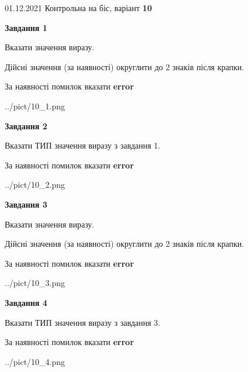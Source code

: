 \documentclass[11pt, ukrainian]{article}
\begin{document}
{01.12.2021 Контрольна на біс, варіант  \No \textbf { 10 }\par}
{
\begin {large}
{\begin {center}\textbf{Завдання 1}\end {center}}\par
Вказати значення виразу. \par
Дійсні значення (за наявності) округлити до 2 знаків після крапки. \par
За наявності помилок вказати \textbf{error}

\begin{center}
	{../pict/10_1.png}
\end{center}
\newpage

{\begin {center}\textbf{Завдання 2}\end {center}}\par
Вказати ТИП значення виразу з завдання 1. \par
За наявності помилок вказати \textbf{error}

\begin{center}
	{../pict/10_2.png}
\end{center}
\newpage

{\begin {center}\textbf{Завдання 3}\end {center}}\par
Вказати значення виразу. \par
Дійсні значення (за наявності) округлити до 2 знаків після крапки. \par
За наявності помилок вказати \textbf{error}

\begin{center}
	{../pict/10_3.png}
\end{center}
\newpage

{\begin {center}\textbf{Завдання 4}\end {center}}\par
Вказати ТИП значення виразу з завдання 3. \par
За наявності помилок вказати \textbf{error}

\begin{center}
	{../pict/10_4.png}
\end{center}
\newpage


\end{large}}
\end{document}
